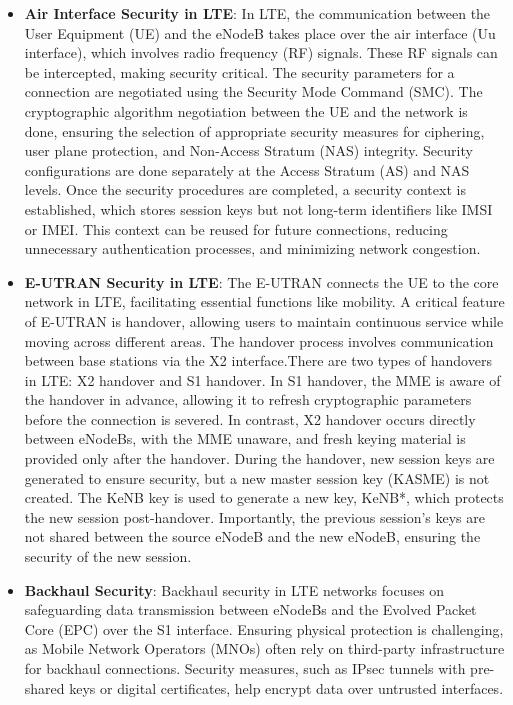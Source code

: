 \documentclass[conference]{IEEEtran}
\begin{document}
\begin{itemize}
    \item \textbf{Air Interface Security in LTE}: 
    In LTE, the communication between the User Equipment (UE) and the eNodeB takes place over the air interface (Uu interface), which involves radio frequency (RF) signals. These RF signals can be intercepted, making security critical. The security parameters for a connection are negotiated using the Security Mode Command (SMC). The cryptographic algorithm negotiation between the UE and the network is done, ensuring the selection of appropriate security measures for ciphering, user plane protection, and Non-Access Stratum (NAS) integrity. Security configurations are done separately at the Access Stratum (AS) and NAS levels. Once the security procedures are completed, a security context is established, which stores session keys but not long-term identifiers like IMSI or IMEI. This context can be reused for future connections, reducing unnecessary authentication processes, and minimizing network congestion\cite{cichonski2016guide}.

    \item \textbf{E-UTRAN Security in LTE}: 
    The E-UTRAN connects the UE to the core network in LTE, facilitating essential functions like mobility. A critical feature of E-UTRAN is handover, allowing users to maintain continuous service while moving across different areas. The handover process involves communication between base stations via the X2 interface.There are two types of handovers in LTE: X2 handover and S1 handover. In S1 handover, the MME is aware of the handover in advance, allowing it to refresh cryptographic parameters before the connection is severed. In contrast, X2 handover occurs directly between eNodeBs, with the MME unaware, and fresh keying material is provided only after the handover. During the handover, new session keys are generated to ensure security, but a new master session key (KASME) is not created. The KeNB key is used to generate a new key, KeNB*, which protects the new session post-handover. Importantly, the previous session's keys are not shared between the source eNodeB and the new eNodeB, ensuring the security of the new session\cite{cichonski2016guide}.


    \item \textbf{Backhaul Security}: 
    Backhaul security in LTE networks focuses on safeguarding data transmission between eNodeBs and the Evolved Packet Core (EPC) over the S1 interface. Ensuring physical protection is challenging, as Mobile Network Operators (MNOs) often rely on third-party infrastructure for backhaul connections. Security measures, such as IPsec tunnels with pre-shared keys or digital certificates, help encrypt data over untrusted interfaces\cite{cichonski2016guide}.


\end{itemize}
\end{document}
